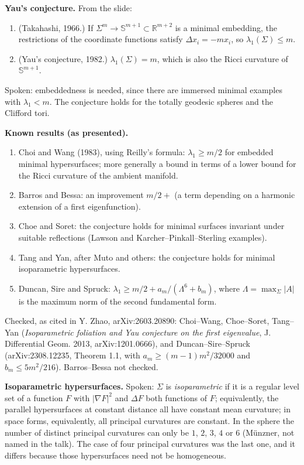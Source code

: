 \medskip\noindent
{\bf Yau's conjecture.} From the slide:
\begin{enumerate}
\item (Takahashi, 1966.) If
$\Sigma^m \to \mathbb{S}^{m+1} \subset
\mathbb{R}^{m+2}$ is a minimal embedding,
the restrictions of the coordinate
functions satisfy $\Delta x_i = -m x_i$, so
$\lambda_1(\Sigma) \le m$.
\item (Yau's conjecture, 1982.)
$\lambda_1(\Sigma) = m$, which is also the
Ricci curvature of $\mathbb{S}^{m+1}$.
\end{enumerate}
Spoken: embeddedness is needed, since there
are immersed minimal examples with
$\lambda_1 < m$. The conjecture holds for
the totally geodesic spheres and the
Clifford tori.

\medskip\noindent
{\bf Known results (as presented).}
\begin{enumerate}
\item Choi and Wang (1983), using Reilly's
formula: $\lambda_1 \ge m/2$ for embedded
minimal hypersurfaces; more generally a
bound in terms of a lower bound for the
Ricci curvature of the ambient manifold.
\item Barros and Bessa: an improvement
$m/2 + {}$ (a term depending on a harmonic
extension of a first eigenfunction).
\item Choe and Soret: the conjecture holds
for minimal surfaces invariant under
suitable reflections (Lawson and
Karcher--Pinkall--Sterling examples).
\item Tang and Yan, after Muto and others:
the conjecture holds for minimal
isoparametric hypersurfaces.
\item Duncan, Sire and Spruck:
$\lambda_1 \ge m/2 + a_m/(\Lambda^6 + b_m)$,
where $\Lambda = \max_\Sigma |A|$ is the
maximum norm of the second fundamental
form.
\end{enumerate}
Checked, as cited in Y. Zhao,
arXiv:2603.20890: Choi--Wang, Choe--Soret,
Tang--Yan (\emph{Isoparametric foliation and
Yau conjecture on the first eigenvalue}, J.
Differential Geom. 2013, arXiv:1201.0666),
and Duncan--Sire--Spruck
(arXiv:2308.12235, Theorem 1.1, with
$a_m \ge (m-1)m^2/32000$ and
$b_m \le 5m^2/216$). Barros--Bessa not
checked.

\medskip\noindent
{\bf Isoparametric hypersurfaces.} Spoken:
$\Sigma$ is \emph{isoparametric} if it is a
regular level set of a function $F$ with
$|\nabla F|^2$ and $\Delta F$ both functions
of $F$; equivalently, the parallel
hypersurfaces at constant distance all have
constant mean curvature; in space forms,
equivalently, all principal curvatures are
constant. In the sphere the number of
distinct principal curvatures can only be
$1$, $2$, $3$, $4$ or $6$ (M\"unzner, not
named in the talk). The case of four
principal curvatures was the last one, and
it differs because those hypersurfaces need
not be homogeneous.

